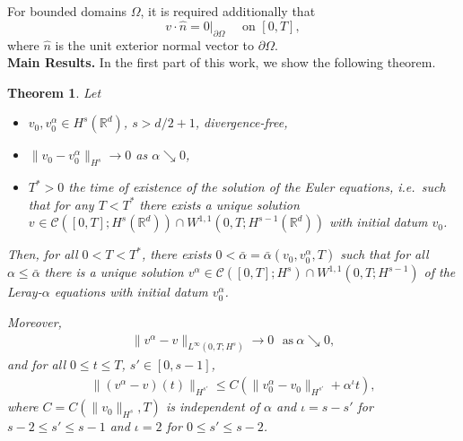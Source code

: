 \documentclass{amsart}
\newtheorem{theorem}{Theorem}
\begin{document}
For bounded domains $\Omega$, it is required additionally that
\begin{equation}
    v\cdot \hat{n} =0|_{\partial \Omega} \quad\text{ on } [0,T],
\end{equation}
where $\hat{n}$ is the unit exterior normal vector to $\partial \Omega$.\\

\textbf{Main Results.}
In the first part of this work, we show the following theorem.
    \begin{theorem}
    \label{thm:main2}
Let 
\begin{itemize}
\item $v_{0},v^{\alpha}_{0} \in H^s_{}(\mathbb{R}^d)$, $s>d/2+1$, divergence-free, 
\item $\|v_0 -v^{\alpha}_{0}\|_{H^s} \to 0$ as $\alpha \searrow 0$,
\item $T^*>0$ the time of existence of the solution of the Euler equations, i.e.\ such that for any $T<T^*$ there exists a unique solution $v^{} \in \mathcal{C}([0,T];H^s_{}(\mathbb{R}^d)) \cap W^{1,1}(0,T;H^{s-1}_{}(\mathbb{R}^d))$ with initial datum $v_0$. 
\end{itemize}
Then, for all $0<T<T^*$, there exists $0<\bar{\alpha} = \bar{\alpha}(v_0,v_{0}^{\alpha}, T)$ such that for all $\alpha \leq \bar{\alpha}$ there is a unique solution $v^{\alpha} \in \mathcal{C}([0,T];H^s_{}) \cap W^{1,1}(0,T;H^{s-1}_{})$ of the Leray-$\alpha$ equations with initial datum $v^{\alpha}_{0}$. 

Moreover,
   \begin{equation}
       \begin{aligned}
           \|v^{\alpha}-v\|_{L^{\infty}(0,T;H^s)} \to 0 \ \ \ \text{as} \  \alpha \searrow0,
       \end{aligned}
   \end{equation}
 and for all $0\leq t \leq T$, $s' \in [0,s-1]$,
    \begin{equation}
    \label{eq: thm main1 interpol}
        \begin{aligned}
            \|(v^{\alpha}-v)(t)\|_{H^{s'}} \leq C\left( \|v^{\alpha}_0-v_0\|_{H^{s'}} + \alpha^{\iota} t\right),
       \end{aligned}
    \end{equation}
where $C=C(\|v_0\|_{H^s},T)$ is independent of $\alpha$ and $\iota=s-s'$ for $s-2\leq s' \leq s-1$ and $\iota=2$ for $0\leq s'\leq s-2$.
    \end{theorem}
    
\end{document}

